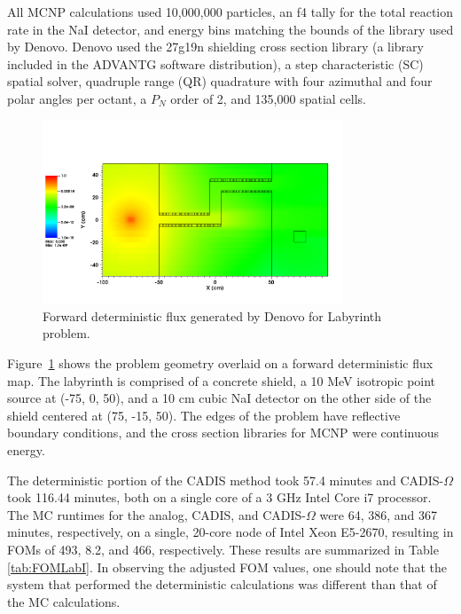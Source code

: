 \documentclass[12pt]{article}
\begin{document}
All MCNP calculations used 10,000,000 particles, an f4 tally for the total reaction rate in the NaI detector, and energy bins matching the bounds of the library used by Denovo. 
Denovo used the 27g19n shielding cross section library (a library included in the ADVANTG software distribution), a step characteristic (SC) spatial solver, quadruple range (QR) quadrature with four azimuthal and four polar angles per octant, a $P_N$ order of 2, and 135,000 spatial cells.%

\begin{figure}
  \begin{center}
    \includegraphics[width=0.80\textwidth]{./images/maze2_forward_group00_adjusted.png}
    \caption[]{\label{fig::fwdflux}Forward deterministic flux generated by Denovo for Labyrinth problem.}
  \end{center}
\end{figure}
Figure~\ref{fig::fwdflux} shows the problem geometry overlaid on a forward deterministic flux map. The labyrinth is comprised of a concrete shield, a 10 MeV isotropic point source at (-75, 0, 50), and a 10 cm cubic NaI detector on the other side of the shield centered at (75, -15, 50). The edges of the problem have reflective boundary conditions, and the cross section libraries for MCNP were continuous energy. 

The deterministic portion of the CADIS method took 57.4 minutes and CADIS-$\Omega$ took 116.44 minutes, both on a single core of a 3 GHz Intel Core i7 processor. The MC runtimes for the analog, CADIS, and CADIS-$\Omega$ were 64, 386, and 367 minutes, respectively, on a single, 20-core node of Intel Xeon E5-2670, resulting in FOMs of 493, 8.2, and 466, respectively. These results are summarized in Table \ref{tab:FOMLabI}. In observing the adjusted FOM values, one should note that the system that performed the deterministic calculations was different than that of the MC calculations. 
\end{document}
